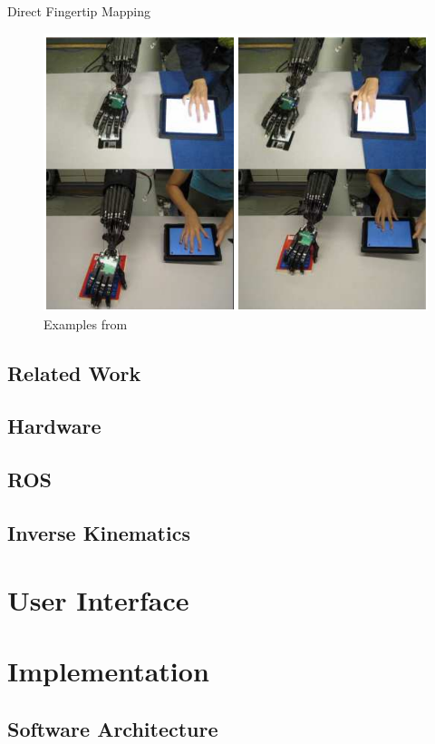 \documentclass[t]{beamer}
\begin{document}
\begin{frame}{Direct Fingertip Mapping}
\begin{figure}
	\includegraphics[height=0.6\textheight]{assets/pres/dftm_toh.PNG}
	\caption{Examples from \citeauthor{conf:humanoids:TohHLBZP12}\cite{conf:humanoids:TohHLBZP12}}
\end{figure}
\end{frame}

\subsection{Related Work}
\subsection{Hardware}
\subsection{ROS}
\subsection{Inverse Kinematics}

\section{User Interface}
\section{Implementation}
\subsection{Software Architecture}
\end{document}

